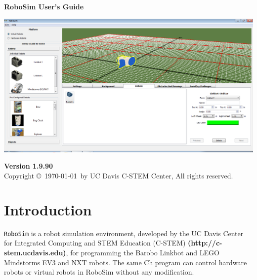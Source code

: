 \documentclass{article}
\begin{document}
\begin{center}
\vspace{2cm}
{\Huge\sf\bf RoboSim User's Guide} \\
\vspace{2.5cm}
\begin{center}
	\includegraphics[width=6in]{pictures/gui}
\end{center}
\vspace{1.5cm}
{\Large\bf Version 1.9.90} \\
\vspace{6cm}
Copyright \copyright\ \today\ by UC Davis C-STEM Center, All rights reserved.
\end{center}

\newpage
\tableofcontents
\newpage

%
%
\section{Introduction}
\texttt{RoboSim} is a robot simulation environment, developed by the UC Davis
Center for Integrated Computing and STEM Education (C-STEM) {\color{blue} \bf
(http://c-stem.ucdavis.edu)}, for programming the Barobo Linkbot and LEGO
Mindstorms EV3 and NXT robots.  The same Ch program  can control hardware robots
or virtual robots in RoboSim without any modification.

%
%
\end{document}
